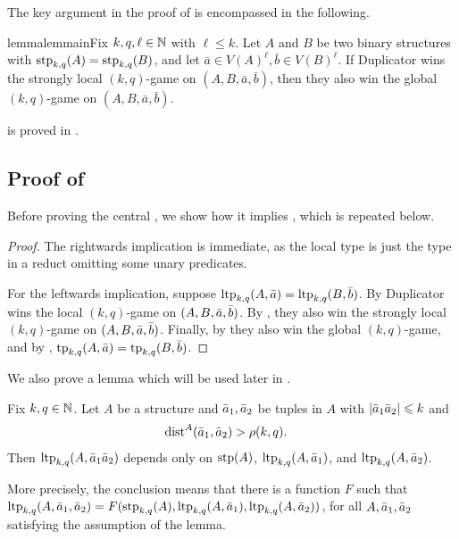 The key argument in the proof of  is encompassed in the following.
\begin{restatable}{lemma}{lemmain}\label{lem:main}Fix $k,q,\ell\in\mathbb N$ with $\ell\le k$.
    Let \(A\) and \(B\) be two binary structures with \(\textnormal{stp}_{k,q}(A)=\textnormal{stp}_{k,q}(B)\),
    and let \(\bar a\in V(A)^\ell,\bar b\in V(B)^\ell\).    
    If Duplicator wins the strongly local \((k,q)\)-game on  \((A,B,\bar a,\bar b)\), then they also win the global \((k,q)\)-game on  \((A,B,\bar a,\bar b)\).
\end{restatable}

 is proved in .



\subsection{Proof of }\label{sec:gameproof}
Before proving the central , we show how it implies , which is repeated below.

\localglobalgame*
\begin{proof}
    The rightwards implication is immediate, as the local type is just the type in a reduct omitting some unary predicates.

    For  the leftwards implication,
   suppose 
 \(\textnormal{ltp}_{k,q}(A,\bar a) = \textnormal{ltp}_{k,q}(B,\bar b)\).
 By 
             Duplicator wins the local \((k,q)\)-game on \((A,B, \bar a, \bar b)\).
        By ,  they also win the strongly local \((k,q)\)-game on \((A,B, \bar a, \bar b)\).
        Finally, by  they also win the global \((k,q)\)-game,
            and by , \(\textnormal{tp}_{k,q}(A,\bar a) = \textnormal{tp}_{k,q}(B,\bar b)\).
\end{proof}
We also prove a lemma which will be used later in .

\begin{lemma}\label{lem:far-ltp}
    Fix $k,q\in\mathbb N$. Let $A$ be a structure and  $\bar a_1,\bar a_2$ be tuples in $A$
    with $|\bar a_1\bar a_2|\leqslant k$ and 
    \begin{align*}
        \mathrm{dist}^A(\bar a_1,\bar a_2)&>\rho(k,q).
    \end{align*}
Then $\textnormal{ltp}_{k,q}(A,\bar a_1\bar a_2)$ depends only on $\textnormal{stp}(A)$, $\textnormal{ltp}_{k,q}(A,\bar a_1)$, and
$\textnormal{ltp}_{k,q}(A,\bar a_2)$.
\end{lemma}
More precisely, the conclusion means that there is a function $F$ such that 
 $\textnormal{ltp}_{k,q}(A,\bar a_1,\bar a_2)=F(\textnormal{stp}_{k,q}(A),\textnormal{ltp}_{k,q}(A,\bar a_1),\textnormal{ltp}_{k,q}(A,\bar a_2))$,
 for all $A,\bar a_1,\bar a_2$ satisfying the assumption of the lemma.

